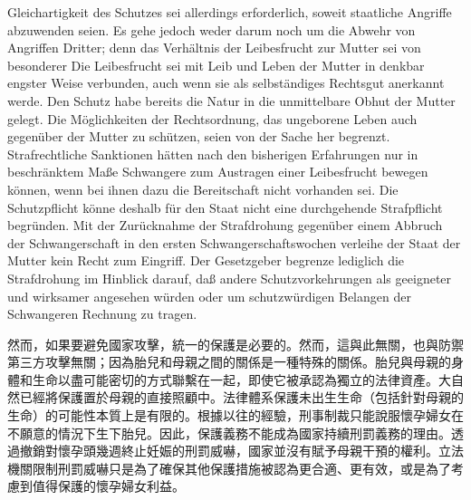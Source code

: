 \documentclass[12pt]{article}
\begin{document}
\syncleft
\begin{sourcepara}
Gleichartigkeit des Schutzes sei allerdings erforderlich, soweit staatliche Angriffe abzuwenden seien. Es gehe jedoch weder darum noch um die Abwehr von Angriffen Dritter; denn das Verhältnis der Leibesfrucht zur Mutter sei von besonderer \abbrArt{} Die Leibesfrucht sei mit Leib und Leben der Mutter in denkbar engster Weise verbunden, auch wenn sie als selbständiges Rechtsgut anerkannt werde. Den Schutz habe bereits die Natur in die unmittelbare Obhut der Mutter gelegt. Die Möglichkeiten der Rechtsordnung, das ungeborene Leben auch gegenüber der Mutter zu schützen, seien von der Sache her begrenzt. Strafrechtliche Sanktionen hätten nach den bisherigen Erfahrungen nur in beschränktem Maße Schwangere zum Austragen einer Leibesfrucht bewegen können, wenn bei ihnen dazu die Bereitschaft nicht vorhanden sei. Die Schutzpflicht könne deshalb für den Staat nicht eine durchgehende Strafpflicht begründen. Mit der Zurücknahme der Strafdrohung gegenüber einem Abbruch der Schwangerschaft in den ersten Schwangerschaftswochen verleihe der Staat der Mutter kein Recht zum Eingriff. Der Gesetzgeber begrenze lediglich die Strafdrohung im Hinblick darauf, daß andere Schutzvorkehrungen als geeigneter und wirksamer angesehen würden oder um schutzwürdigen Belangen der Schwangeren Rechnung zu tragen.
\end{sourcepara}
\begin{transpara}
然而，如果要避免國家攻擊，統一的保護是必要的。然而，這與此無關，也與防禦第三方攻擊無關；因為胎兒和母親之間的關係是一種特殊的關係。胎兒與母親的身體和生命以盡可能密切的方式聯繫在一起，即使它被承認為獨立的法律資產。大自然已經將保護置於母親的直接照顧中。法律體系保護未出生生命（包括針對母親的生命）的可能性本質上是有限的。根據以往的經驗，刑事制裁只能說服懷孕婦女在不願意的情況下生下胎兒。因此，保護義務不能成為國家持續刑罰義務的理由。透過撤銷對懷孕頭幾週終止妊娠的刑罰威嚇，國家並沒有賦予母親干預的權利。立法機關限制刑罰威嚇只是為了確保其他保護措施被認為更合適、更有效，或是為了考慮到值得保護的懷孕婦女利益。
\end{transpara}
\end{document}
